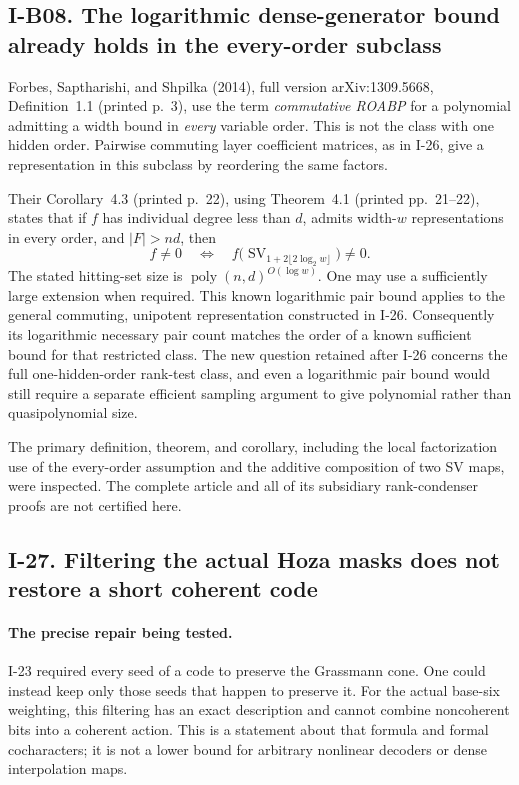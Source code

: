 \subsection{I-B08. The logarithmic dense-generator bound already holds in the every-order subclass}
\label{I-B08}

Forbes, Saptharishi, and Shpilka (2014), full version
arXiv:1309.5668, Definition~1.1 (printed p.~3), use the term
\emph{commutative ROABP} for a polynomial admitting a width
bound in \emph{every} variable order.  This is not the class
with one hidden order.  Pairwise commuting layer coefficient
matrices, as in I-26, give a representation in this subclass
by reordering the same factors.

Their Corollary~4.3 (printed p.~22), using Theorem~4.1
(printed pp.~21--22), states that if $f$ has individual degree
less than $d$, admits width-$w$ representations in every order,
and $|F|>nd$, then
\[
 f\ne0\quad\Longleftrightarrow\quad
 f\bigl(\operatorname{SV}_{1+2\lfloor2\log_2w\rfloor}\bigr)
       \ne0.
\]
The stated hitting-set size is
$\operatorname{poly}(n,d)^{O(\log w)}$.
One may use a sufficiently large extension when required.
This known logarithmic pair bound applies to the general
commuting, unipotent representation constructed in I-26.
Consequently its logarithmic necessary pair count matches
the order of a known sufficient bound for that restricted
class.  The new question retained after I-26 concerns the
full one-hidden-order rank-test class, and even a logarithmic
pair bound would still require a separate efficient sampling
argument to give polynomial rather than quasipolynomial size.

The primary definition, theorem, and corollary, including
the local factorization use of the every-order assumption
and the additive composition of two SV maps, were inspected.
The complete article and all of its subsidiary rank-condenser
proofs are not certified here.


\subsection{I-27. Filtering the actual Hoza masks does not restore a short coherent code}
\label{I-27}

\paragraph{The precise repair being tested.}
I-23 required every seed of a code to preserve the Grassmann cone.
One could instead keep only those seeds that happen to preserve it.
For the actual base-six weighting, this filtering has an exact
description and cannot combine noncoherent bits into a coherent
action.  This is a statement about that formula and formal
cocharacters; it is not a lower bound for arbitrary nonlinear
decoders or dense interpolation maps.

